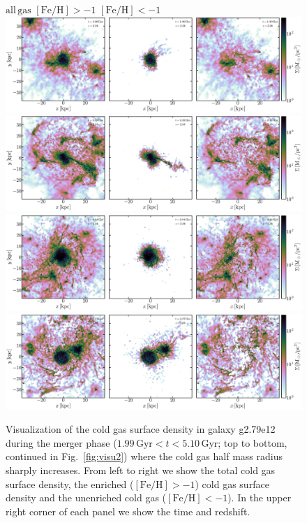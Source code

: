 \documentclass[useAMS,usenatbib]{mnras}
\begin{document}
\begin{figure}
    \begin{centering}
    \hspace*{.5em} $\mathrm{all\, gas}$ \hspace*{12.5em} $\mathrm{[Fe/H]}>-1$ \hspace*{12.em} $\mathrm{[Fe/H]}<-1$ 
     \includegraphics[width=.99\linewidth]{static/frame0019.pdf}
     \includegraphics[width=.99\linewidth]{static/frame0027.pdf}
     \includegraphics[width=.99\linewidth]{static/frame0038.pdf}
     \includegraphics[width=.99\linewidth]{static/frame0044.pdf}
     \vspace*{-1.em}
     \caption{
      Visualization of the cold gas surface density in galaxy g2.79e12 during the merger phase ($1.99\, \mathrm{Gyr} < t < 5.10\, \mathrm{Gyr}$; top to bottom, continued in Fig.~\ref{fig:visu2}) where the cold gas half mass radius sharply increases. From left to right we show the total cold gas surface density, the enriched ($\mathrm{[Fe/H]}>-1$) cold gas surface density and the unenriched cold gas ($\mathrm{[Fe/H]}<-1$). In the upper right corner of each panel we show the time and redshift.     
     }
     \label{fig:visu}
    \end{centering}
\end{figure}
\end{document}
